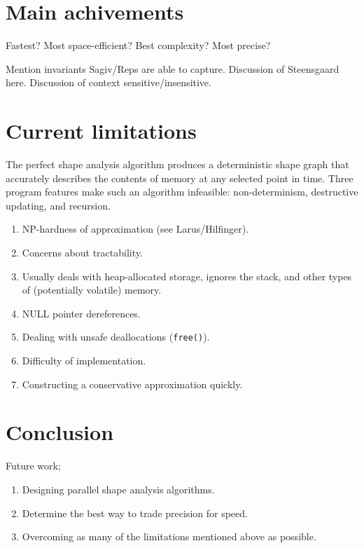 \documentclass{article}
\begin{document}
\section{Main achivements}

Fastest?
Most space-efficient?
Best complexity?
Most precise?

Mention invariants Sagiv/Reps are able to capture.
Discussion of Steensgaard here.
Discussion of context sensitive/insensitive.

\section{Current limitations}

The perfect shape analysis algorithm produces a deterministic shape graph
that accurately describes the contents of memory at any selected point in
time. Three program features make such an algorithm infeasible:
non-determinism, destructive updating, and recursion. 

\begin{enumerate}[1.]
    \item NP-hardness of approximation (see Larus/Hilfinger).
    \item Concerns about tractability.
    \item Usually deals with heap-allocated storage, ignores the stack, and
        other types of (potentially volatile) memory.
    \item NULL pointer dereferences.
    \item Dealing with unsafe deallocations (\texttt{free()}).
    \item Difficulty of implementation.
    \item Constructing a conservative approximation quickly.
\end{enumerate}

\section{Conclusion}

Future work;
\begin{enumerate}[1.]
    \item Designing parallel shape analysis algorithms.
    \item Determine the best way to trade precision for speed.
    \item Overcoming as many of the limitations mentioned above as possible.
\end{enumerate}
\end{document}
